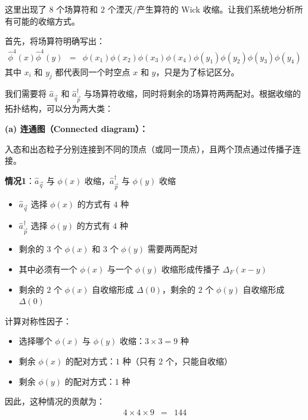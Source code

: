\begin{example}
\begin{solution}
\begin{enumerate}
\begin{itemize}
                这里出现了 $8$ 个场算符和 $2$ 个湮灭/产生算符的 Wick 收缩。让我们系统地分析所有可能的收缩方式。

                首先，将场算符明确写出：
                \begin{eqnarray*}
                    \hat{\phi}^4(x)\hat{\phi}^4(y) &=& \phi(x_1)\phi(x_2)\phi(x_3)\phi(x_4)\phi(y_1)\phi(y_2)\phi(y_3)\phi(y_4)
                \end{eqnarray*}
                其中 $x_i$ 和 $y_j$ 都代表同一个时空点 $x$ 和 $y$，只是为了标记区分。

                我们需要将 $\hat{a}_{\vec{q}}$ 和 $\hat{a}_{\vec{p}}^\dagger$ 与场算符收缩，同时将剩余的场算符两两配对。根据收缩的拓扑结构，可以分为两大类：

                \textbf{(a) 连通图（Connected diagram）：}

                入态和出态粒子分别连接到不同的顶点（或同一顶点），且两个顶点通过传播子连接。

                \textbf{情况1}：$\hat{a}_{\vec{q}}$ 与 $\phi(x)$ 收缩，$\hat{a}_{\vec{p}}^\dagger$ 与 $\phi(y)$ 收缩
                \begin{itemize}
                    \item $\hat{a}_{\vec{q}}$ 选择 $\phi(x)$ 的方式有 $4$ 种
                    \item $\hat{a}_{\vec{p}}^\dagger$ 选择 $\phi(y)$ 的方式有 $4$ 种
                    \item 剩余的 $3$ 个 $\phi(x)$ 和 $3$ 个 $\phi(y)$ 需要两两配对
                    \item 其中必须有一个 $\phi(x)$ 与一个 $\phi(y)$ 收缩形成传播子 $\Delta_F(x-y)$
                    \item 剩余的 $2$ 个 $\phi(x)$ 自收缩形成 $\Delta(0)$，剩余的 $2$ 个 $\phi(y)$ 自收缩形成 $\Delta(0)$
                \end{itemize}

                计算对称性因子：
                \begin{itemize}
                    \item 选择哪个 $\phi(x)$ 与 $\phi(y)$ 收缩：$3 \times 3 = 9$ 种
                    \item 剩余 $\phi(x)$ 的配对方式：$1$ 种（只有 $2$ 个，只能自收缩）
                    \item 剩余 $\phi(y)$ 的配对方式：$1$ 种
                \end{itemize}

                因此，这种情况的贡献为：
                \begin{eqnarray*}
                    4 \times 4 \times 9 &=& 144
                \end{eqnarray*}


\end{itemize}
\end{enumerate}
\end{solution}
\end{example}
